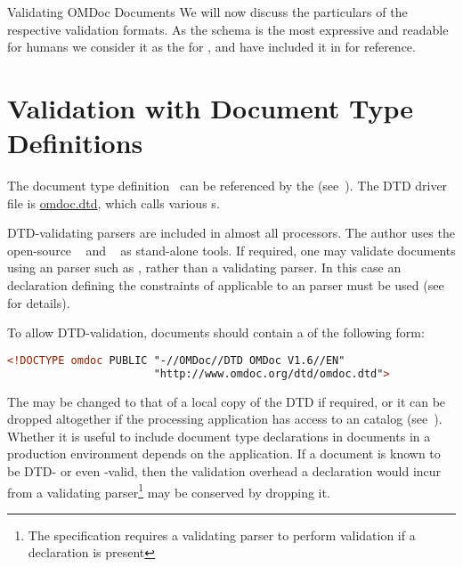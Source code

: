 \begin{module}[id=validating]
\begin{omgroup}[id=validating]{Validating OMDoc Documents}
We will now discuss the particulars of the respective validation formats. As the
{\relaxng} schema is the most expressive and readable for humans we consider it as the
{} for {\omdoc}, and have included it in
{} for reference.

\section{Validation with Document Type Definitions}\label{sec:validate-dtd}  
  The {\omdoc} document type definition~\cite{OMDocDTD:URL} can be referenced by the
  {} {}
  (see~). The DTD driver file is \url{omdoc.dtd}, which calls various
  {s}.
  
  DTD-validating {\xml} parsers are included in almost all {\xml} processors. The author
  uses the open-source {\rxp}~\cite{Tobin:RXP} and
  {}~\cite{Veillard:libxml2} as stand-alone tools. If required, one may
  validate {\omdoc} documents using an {\sgml} parser such as {\nsgmls}, rather than a
  validating {\xml} parser. In this case an {\sgml} declaration defining the constraints
  of {\xml} applicable to an {\sgml} parser must be used (see~\cite{Clark:csx97} for
  details).

  To allow DTD-validation, {\omdoc} documents should contain a {} of the following form:
\begin{center}
\begin{lstlisting}[language=XML,index={DOCTYPE,omdoc}]
<!DOCTYPE omdoc PUBLIC "-//OMDoc//DTD OMDoc V1.6//EN"
                       "http://www.omdoc.org/dtd/omdoc.dtd">
\end{lstlisting}
\end{center}
The {} may be changed to that of a local copy of the DTD if required, or it
can be dropped altogether if the processing application has access to an {\xml}
catalog (see~).  Whether it is useful to include
document type declarations in documents in a production environment depends on the
application. If a document is known to be DTD- or even {\omdoc}-valid, then the validation
overhead a {} declaration would incur from a validating
parser\footnote{The {\xml} specification requires a validating parser to perform
  validation if a {} declaration is present} may be conserved by
dropping it.



\end{omgroup}
\end{module}
